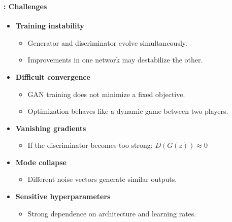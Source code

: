 \documentclass[xcolor=table]{beamer}
\begin{document}
	\begin{frame}
		\frametitle{\insertshortsubtitle}
		\framesubtitle{\insertsection: Challenges}
		
		\begin{itemize}
			
			\item \textbf{Training instability}
			\begin{itemize}
				\item Generator and discriminator evolve simultaneously.
				\item Improvements in one network may destabilize the other.
			\end{itemize}
			
			\item \textbf{Difficult convergence}
			\begin{itemize}
				\item GAN training does not minimize a fixed objective.
				\item Optimization behaves like a dynamic game between two players.
			\end{itemize}
			
			\item \textbf{Vanishing gradients}
			\begin{itemize}
				\item If the discriminator becomes too strong: $D(G(z)) \approx 0$
			\end{itemize}
			
			\item \textbf{Mode collapse}
			\begin{itemize}
				\item Different noise vectors generate similar outputs.
			\end{itemize}
			
			\item \textbf{Sensitive hyperparameters}
			\begin{itemize}
				\item Strong dependence on architecture and learning rates.
			\end{itemize}
			
		\end{itemize}
		
	\end{frame}
	
\end{document}
